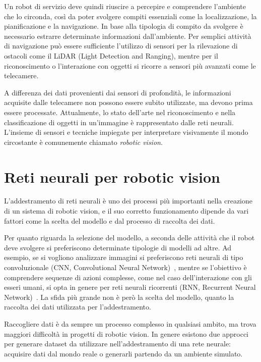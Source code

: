 \documentclass[12pt]{report}
\begin{document}
Un robot di servizio deve quindi riuscire a percepire e comprendere l'ambiente che lo circonda, così da poter svolgere compiti essenziali come la localizzazione, la pianificazione e la navigazione. In base alla tipologia di compito da svolgere è necessario estrarre determinate informazioni dall'ambiente. Per semplici attività di navigazione può essere sufficiente l'utilizzo di sensori per la rilevazione di ostacoli come il LiDAR (Light Detection and Ranging), mentre per il riconoscimento o l'interazione con oggetti si ricorre a sensori più avanzati come le telecamere.

A differenza dei dati provenienti dai sensori di profondità, le informazioni acquisite dalle telecamere non possono essere subito utilizzate, ma devono prima essere processate. Attualmente, lo stato dell'arte nel riconoscimento e nella classificazione di oggetti in un'immagine è rappresentato dalle reti neurali. L'insieme di sensori e tecniche impiegate per interpretare visivamente il mondo circostante è comunemente chiamato \textit{robotic vision}.

\section{Reti neurali per robotic vision}
\label{sec:raccolta_dati}

L'addestramento di reti neurali è uno dei processi più importanti nella creazione di un sistema di robotic vision, e il suo corretto funzionamento dipende da vari fattori come la scelta del modello e dal processo di raccolta dei dati.

Per quanto riguarda la selezione del modello, a seconda delle attività che il robot deve svolgere si preferiscono determinate tipologie di modelli ad altre. Ad esempio, se si vogliono analizzare immagini si preferiscono reti neurali di tipo convoluzionale (CNN, Convolutional Neural Network)~\cite{oshea2015introductionconvolutionalneuralnetworks}, mentre se l'obiettivo è comprendere sequenze di azioni complesse, come nel caso dell'interazione con gli esseri umani, si opta in genere per reti neurali ricorrenti (RNN, Recurrent Neural Network)~\cite{ZHANG20209}. La sfida più grande non è però la scelta del modello, quanto la raccolta dei dati utilizzata per l'addestramento.

Raccogliere dati è da sempre un processo complesso in qualsiasi ambito, ma trova maggiori difficoltà in progetti di robotic vision. In genere esistono due approcci per generare dataset da utilizzare nell'addestramento di una rete neurale: acquisire dati dal mondo reale o generarli partendo da un ambiente simulato.
\end{document}

